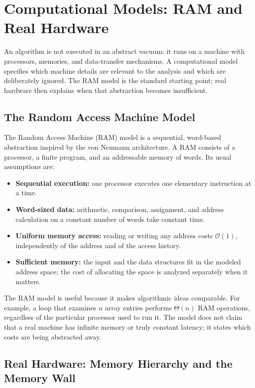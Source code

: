 \section{Computational Models: RAM and Real Hardware}
\label{sec:ram-model}

An algorithm is not executed in an abstract vacuum: it runs on a machine with
processors, memories, and data-transfer mechanisms. A computational model
specifies which machine details are relevant to the analysis and which are
deliberately ignored. The RAM model is the standard starting point; real
hardware then explains when that abstraction becomes insufficient.

\subsection{The Random Access Machine Model}

The Random Access Machine (RAM) model is a sequential, word-based abstraction
inspired by the von Neumann architecture. A RAM consists of a processor, a
finite program, and an addressable memory of words. Its usual assumptions are:

\begin{itemize}
  \item \textbf{Sequential execution:} one processor executes one elementary
    instruction at a time.
  \item \textbf{Word-sized data:} arithmetic, comparison, assignment, and
    address calculation on a constant number of words take constant time.
  \item \textbf{Uniform memory access:} reading or writing any address costs
    $\mathcal{O}(1)$, independently of the address and of the access history.
  \item \textbf{Sufficient memory:} the input and the data structures fit in
    the modeled address space; the cost of allocating the space is analyzed
    separately when it matters.
\end{itemize}

The RAM model is useful because it makes algorithmic ideas comparable. For
example, a loop that examines $n$ array entries performs $\Theta(n)$ RAM
operations, regardless of the particular processor used to run it. The model
does not claim that a real machine has infinite memory or truly constant
latency; it states which costs are being abstracted away.

\subsection{Real Hardware: Memory Hierarchy and the Memory Wall}

